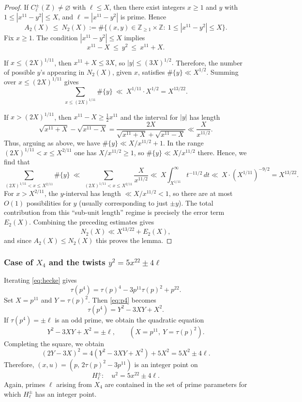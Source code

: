 \documentclass[12pt]{amsart}
\theoremstyle{remark}
\numberwithin{equation}{section}
\begin{document}
\begin{proof}
If $C_{\ell}^{\pm}(\mathbb Z)\neq\varnothing$ with $\ell\le X$,
then there exist integers $x\ge 1$ and $y$ with
$1\le |x^{11}-y^2|\le X$, and $\ell=|x^{11}-y^2|$ is prime. Hence
\[
A_2(X)\ \le\ N_2(X):=\#\{(x,y)\in\mathbb Z_{\ge 1}\times \mathbb Z:\ 1\le |x^{11}-y^2|\le X\}.
\]
Fix $x\ge 1$. The condition $|x^{11}-y^2|\le X$ implies
\[
x^{11}-X\ \le\ y^2\ \le\ x^{11}+X.
\]

If $x\le (2X)^{1/11}$, then $x^{11}+X\le 3X$, so $|y|\le (3X)^{1/2}.$  Therefore, the number of possible $y$'s appearing in $N_2(X)$, given $x$, satisfies
$\#\{y\}\ll X^{1/2}$.
Summing over $x\le (2X)^{1/11}$ gives
\[
\sum_{x\le (2X)^{1/11}}\#\{y\}\ \ll\ X^{1/11}\cdot X^{1/2}=X^{13/22}.
\]

If $x> (2X)^{1/11}$, then $x^{11}-X\ge \tfrac12 x^{11}$ and the interval for $|y|$ has length
\[
\sqrt{x^{11}+X}-\sqrt{x^{11}-X}
=\frac{2X}{\sqrt{x^{11}+X}+\sqrt{x^{11}-X}}
\ll \frac{X}{x^{11/2}}.
\]
Thus, arguing as above, we have $\#\{y\}\ll X/x^{11/2}+1$. In the range $(2X)^{1/11}<x\le X^{2/11}$ one has $X/x^{11/2}\ge 1$, so
$\#\{y\}\ll X/x^{11/2}$ there. Hence, we find that
\[
\sum_{(2X)^{1/11}<x\le X^{2/11}}\#\{y\}\ \ll\ \sum_{(2X)^{1/11}<x\le X^{2/11}}\frac{X}{x^{11/2}}
\ll\ X\int_{X^{1/11}}^\infty t^{-11/2}\,dt
\ll\ X\cdot (X^{1/11})^{-9/2}
= X^{13/22}.
\]
For $x> X^{2/11}$, the $y$-interval has length $\ll X/x^{11/2}<1$,
so there are at most $O(1)$ possibilities for $y$ (usually corresponding to just $\pm y$).
The total contribution from this ``sub-unit length'' regime is precisely the error term $E_2(X)$.
Combining the preceding estimates gives
\[
N_2(X)\ll X^{13/22}+E_2(X),
\]
and since $A_2(X)\le N_2(X)$ this proves the lemma.
\end{proof}



\subsubsection*{Case of $X_4$ and the twists $y^2=5x^{22}\pm 4\ell$}

Iterating \eqref{eq:hecke} gives
\begin{equation}\label{eq:p4}
\tau(p^4)=\tau(p)^4-3p^{11}\tau(p)^2+p^{22}.
\end{equation}
Set $X=p^{11}$ and $Y=\tau(p)^2$. Then \eqref{eq:p4} becomes
\[
\tau(p^4)=Y^2-3XY+X^2.
\]
If $\tau(p^4)=\pm \ell$ is an odd prime, we obtain the quadratic equation
\begin{equation}\label{eq:thuequad}
Y^2-3XY+X^2=\pm \ell,\qquad (X=p^{11},\ Y=\tau(p)^2).
\end{equation}
Completing the square, we obtain
\[
(2Y-3X)^2 = 4(Y^2-3XY+X^2)+5X^2 = 5X^2 \pm 4\ell.
\]
Therefore, $(x,u)=(p,\,2\tau(p)^2-3p^{11})$ is an integer point on
\[
H_{\ell}^{\pm}:\quad u^2 = 5x^{22}\pm 4\ell.
\]
Again, primes $\ell$ arising from $X_4$ are contained in the set of prime
parameters for which $H_{\ell}^{\pm}$
has an integer point.
\end{document}

